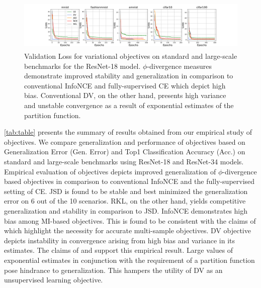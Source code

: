 \documentclass{article}
\begin{document}
\begin{figure}[ht]
\centering
  \includegraphics[height=2.5cm,width=14cm]{18_val_loss.png}
  \caption{Validation Loss for variational objectives on standard and large-scale benchmarks for the ResNet-18 model. $\phi$-divergence measures demonstrate improved stability and generalization in comparison to conventional InfoNCE and fully-supervised CE which depict high bias. Conventional DV, on the other hand, presents high variance and unstable convergence as a result of exponential estimates of the partition function.}
  \label{fig:plot}
\end{figure}
\autoref{tab:table} presents the summary of results obtained from our empirical study of objectives. We compare generalization and performance of objectives based on Generalization Error (Gen. Error) and Top1 Classification Accuracy (Acc.) on standard and large-scale benchmarks using ResNet-18 and ResNet-34 models. Empirical evaluation of objectives depicts improved generalization of $\phi$-divergence based objectives in comparison to conventional InfoNCE and the fully-supervised setting of CE. JSD is found to be stable and best minimized the generalization error on 6 out of the 10 scenarios. RKL, on the other hand, yields competitive generalization and stability in comparison to JSD. InfoNCE demonstrates high bias among MI-based objectives. This is found to be consistent with the claims of \cite{variational} which highlight the necessity for accurate multi-sample objectives. DV objective depicts instability in convergence arising from high bias and variance in its estimates. The claims of \cite{variational} and \cite{infomax} support this empirical result. Large values of exponential estimates in conjunction with the requirement of a partition function pose hindrance to generalization. This hampers the utility of DV as an unsupervised learning objective. 
\end{document}
